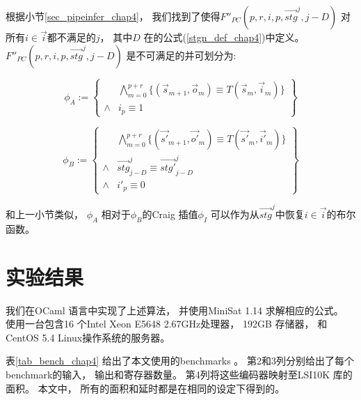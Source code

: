 根据小节\ref{sec_pipeinfer_chap4}，
我们找到了使得$F''_{PC}(p,r,i,p,\vec{stg}^{j},j-D)$ 对所有$i\in \vec{i}$都不满足的$j$，
其中$D$ 在的公式(\ref{stgn_def_chap4})中定义。
$F''_{PC}(p,r,i,p,\vec{stg}^{j},j-D)$ 是不可满足的并可划分为:

\begin{equation}
\phi_A:=
\left\{
\begin{array}{cc}
&\bigwedge_{m=0}^{p+r}
\{
(\vec{s}_{m+1},\vec{o}_m)\equiv T(\vec{s}_m,\vec{i}_m)
\}
\\
\wedge& i_{p}\equiv 1
\end{array}
\right\}
\end{equation}

\begin{equation}
\phi_B:=
\left\{
\begin{array}{cc}
&\bigwedge_{m=0}^{p+r}
\{
(\vec{s'}_{m+1},\vec{o'}_m)\equiv T(\vec{s'}_m,\vec{i'}_m)
\}
\\
\wedge&\vec{stg}^j_{j-D}\equiv \vec{stg'}^j_{j-D} \\
\wedge& i'_{p}\equiv 0
\end{array}
\right\}
\end{equation}

和上一小节类似，
$\phi_A$ 相对于$\phi_B$的Craig 插值$\phi_I$
可以作为从$\vec{stg}^j$中恢复$i\in\vec{i}$的布尔函数。



\section{实验结果}\label{sec_exp_chap4}
我们在OCaml 语言中实现了上述算法，
并使用MiniSat 1.14 求解相应的公式。
使用一台包含16 个Intel Xeon E5648 2.67GHz处理器，
192GB 存储器， 和CentOS 5.4 Linux操作系统的服务器。

表\ref{tab_bench_chap4} 给出了本文使用的benchmarks 。
第2和3列分别给出了每个benchmark的输入， 输出和寄存器数量。
第4列将这些编码器映射至LSI10K 库的面积。
本文中，
所有的面积和延时都是在相同的设定下得到的。



